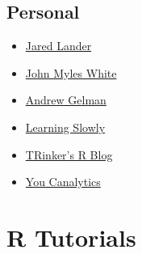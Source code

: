 \documentclass[]{book}
\providecommand{\tightlist}{%
  \setlength{\itemsep}{0pt}\setlength{\parskip}{0pt}}
\theoremstyle{definition}
\theoremstyle{definition}
\theoremstyle{definition}
\theoremstyle{remark}
\begin{document}
\hypertarget{personal}{%
\subsection{Personal}\label{personal}}

\begin{itemize}
\tightlist
\item
  \href{https://www.jaredlander.com/}{Jared Lander}
\item
  \href{http://www.johnmyleswhite.com/}{John Myles White}
\item
  \href{http://andrewgelman.com/}{Andrew Gelman}
\item
  \href{https://jehrlinger.wordpress.com/}{Learning Slowly}
\item
  \href{https://trinkerrstuff.wordpress.com/}{TRinker's R Blog}
\item
  \href{http://ucanalytics.com/blogs/}{You Canalytics}
\end{itemize}

\hypertarget{r-tutorials}{%
\section{R Tutorials}\label{r-tutorials}}
\end{document}
